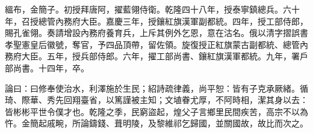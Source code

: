 \begin{pinyinscope}
縕布，金簡子。初授拜唐阿，擢藍翎侍衛。乾隆四十八年，授泰寧鎮總兵。六十年，召授總管內務府大臣。嘉慶三年，授鑲紅旗漢軍副都統。四年，授工部侍郎，賜孔雀翎。奏請增設內務府養育兵，上斥其例外乞恩，意在沽名。俄以清字摺誤書孝聖憲皇后徽號，奪官，予四品頂帶，留佐領。旋復授正紅旗蒙古副都統、總管內務府大臣。五年，授兵部侍郎。六年，擢工部尚書、鑲紅旗漢軍都統。九年，署戶部尚書。十四年，卒。

論曰：曰修奉使治水，利澤施於生民；紹詩疏律義，尚平恕：皆有子克承厥緒。循琦、際華、秀先回翔臺省，以篤謹被主知；文埴眷尤厚，不阿時相，潔其身以去：皆彬彬平世令僕才也。乾隆之季，民窮盜起，煌父子言鄉里民間疾苦，高宗不以為忤。金簡起戚畹，所論鑄錢、葺明陵，及黎維祁乞歸國，並關國故，故比而次之。


\end{pinyinscope}